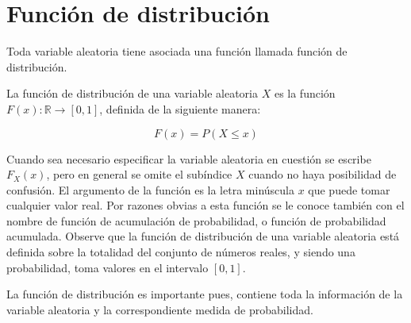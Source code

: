 \pagebreak

\section{Función de distribución}

Toda variable aleatoria tiene asociada una función llamada función de
distribución.

\begin{tcolorbox}[colback=gray!5!white,colframe=gray!60!black,title=Definición: Función de Distribución]

    La función de distribución de una variable aleatoria $X$ es la función 
    $F(x): \mathbb{R} \rightarrow [0,1]$, definida de la siguiente manera:

\begin{equation}
    F(x) = P(X \leq x)
\end{equation}

\end{tcolorbox}

Cuando sea necesario especificar la variable aleatoria en cuestión se escribe
$F_X (x)$, pero en general se omite el subíndice $X$ cuando no haya posibilidad
de confusión. El argumento de la función es la letra minúscula $x$ que puede
tomar cualquier valor real. Por razones obvias a esta función se le conoce
también con el nombre de función de acumulación de probabilidad, o función de
probabilidad acumulada. Observe que la función de distribución de una variable
aleatoria está definida sobre la totalidad del conjunto de números reales, y
siendo una probabilidad, toma valores en el intervalo $[0, 1]$.


La función de distribución es importante pues, contiene toda la información de
la variable aleatoria y la correspondiente medida de probabilidad.

